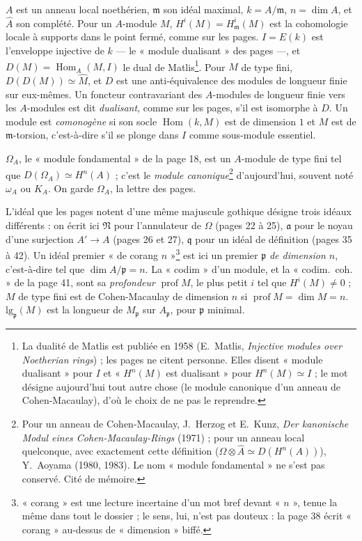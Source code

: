 \documentclass[11pt,a4paper]{article}
\begin{document}
$A$ est un anneau local noethérien, $\mathfrak{m}$ son idéal maximal,
$k = A/\mathfrak{m}$, $n = \dim A$, et $\widehat{A}$ son complété. Pour un
$A$-module $M$, $H^i(M) = H^i_{\mathfrak{m}}(M)$ est la cohomologie locale à
supports dans le point fermé, comme sur les pages. $I = E(k)$ est l'enveloppe
injective de $k$ --- le « module dualisant » des pages ---, et
$D(M) = \operatorname{Hom}_A(M, I)$ le dual de Matlis\footnote{La dualité de
Matlis est publiée en 1958 (E.~Matlis, \emph{Injective modules over Noetherian
rings}) ; les pages ne citent personne. Elles disent « module dualisant » pour
$I$ et « $H^n(M)$ est dualisant » pour $H^n(M) \simeq I$ ; le mot désigne
aujourd'hui tout autre chose (le module canonique d'un anneau de
Cohen-Macaulay), d'où le choix de ne pas le reprendre.}. Pour $M$ de type fini,
$D(D(M)) \simeq \widehat{M}$, et $D$ est une anti-équivalence des modules de
longueur finie sur eux-mêmes. Un foncteur contravariant des $A$-modules de
longueur finie vers les $A$-modules est dit \emph{dualisant}, comme sur les
pages, s'il est isomorphe à $D$. Un module est \emph{comonogène} si son socle
$\operatorname{Hom}(k, M)$ est de dimension $1$ et $M$ est de
$\mathfrak{m}$-torsion, c'est-à-dire s'il se plonge dans $I$ comme sous-module
essentiel.

$\Omega_A$, le « module fondamental » de la page 18, est un $A$-module de type
fini tel que $D(\Omega_A) \simeq H^n(A)$ ; c'est le \emph{module
canonique}\footnote{Pour un anneau de Cohen-Macaulay, J.~Herzog et E.~Kunz,
\emph{Der kanonische Modul eines Cohen-Macaulay-Rings} (1971) ; pour un anneau
local quelconque, avec exactement cette définition ($\Omega \otimes \widehat{A}
\simeq D(H^n(A))$), Y.~Aoyama (1980, 1983). Le nom « module fondamental » ne
s'est pas conservé. Cité de mémoire.} d'aujourd'hui, souvent noté $\omega_A$ ou
$K_A$. On garde $\Omega_A$, la lettre des pages.

L'idéal que les pages notent d'une même majuscule gothique désigne trois
idéaux différents : on écrit ici $\mathfrak{N}$ pour l'annulateur de $\Omega$
(pages 22 à 25), $\mathfrak{a}$ pour le noyau d'une surjection $A' \to A$
(pages 26 et 27), $\mathfrak{q}$ pour un idéal de définition (pages 35 à 42).
Un idéal premier « de corang $n$ »\footnote{« corang » est une lecture
incertaine d'un mot bref devant « $n$ », tenue la même dans tout le dossier ;
le sens, lui, n'est pas douteux : la page 38 écrit « corang » au-dessus de
« dimension » biffé.} est ici un premier $\mathfrak{p}$ \emph{de dimension
$n$}, c'est-à-dire tel que $\dim A/\mathfrak{p} = n$. La « codim » d'un module,
et la « codim.\ coh. » de la page 41, sont sa \emph{profondeur}
$\operatorname{prof} M$, le plus petit $i$ tel que $H^i(M) \neq 0$ ; $M$ de
type fini est de Cohen-Macaulay de dimension $n$ si $\operatorname{prof} M =
\dim M = n$. $\mathrm{lg}_{\mathfrak{p}}(M)$ est la longueur de
$M_{\mathfrak{p}}$ sur $A_{\mathfrak{p}}$, pour $\mathfrak{p}$ minimal.
\end{document}
